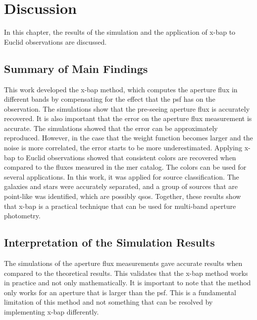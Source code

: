\chapter{Discussion}

In this chapter, the results of the simulation and the application of \gls{x-bap} to Euclid observations are discussed. 

\section{Summary of Main Findings}

This work developed the \gls{x-bap} method, which computes the aperture flux in different bands by compensating for the effect that the \gls{psf} has on the observation. The simulations show that the pre-seeing aperture flux is accurately recovered. It is also important that the error on the aperture flux measurement is accurate. The simulations showed that the error can be approximately reproduced. However, in the case that the weight function becomes larger and the noise is more correlated, the error starts to be more underestimated. Applying \gls{x-bap} to Euclid observations showed that consistent colors are recovered when compared to the fluxes measured in the \gls{mer} catalog. The colors can be used for several applications. In this work, it was applied for source classification. The galaxies and stars were accurately separated, and a group of sources that are point-like was identified, which are possibly \glspl{qso}. Together, these results show that \gls{x-bap} is a practical technique that can be used for multi-band aperture photometry.

\section{Interpretation of the Simulation Results}

The simulations of the aperture flux measurements gave accurate results when compared to the theoretical results. This validates that the \gls{x-bap} method works in practice and not only mathematically. It is important to note that the method only works for an aperture that is larger than the \gls{psf}. This is a fundamental limitation of this method and not something that can be resolved by implementing \gls{x-bap} differently. 

